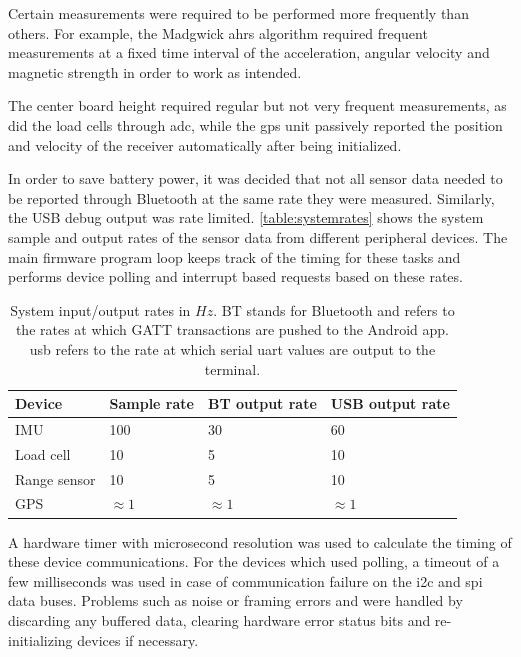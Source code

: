 Certain measurements were required to be performed more frequently than others. For example, the Madgwick \gls{ahrs} algorithm required frequent measurements at a fixed time interval of the acceleration, angular velocity and magnetic strength in order to work as intended.

The center board height required regular but not very frequent measurements, as did the load cells through \gls{adc}, while the \gls{gps} unit passively reported the position and velocity of the receiver automatically after being initialized.

In order to save battery power, it was decided that not all sensor data needed to be reported through Bluetooth at the same rate they were measured. Similarly, the USB debug output was rate limited. \autoref{table:systemrates} shows the system sample and output rates of the sensor data from different peripheral devices. The main firmware program loop keeps track of the timing for these tasks and performs device polling and interrupt based requests based on these rates.

\begin{table}[H]
\centering
\begin{tabular}{ l | l | l | l }
  Device 	& Sample rate & BT output rate 	& USB output rate\\
  \hline
  IMU 		& 100 		& 30 			& 60\\
  Load cell 	& 10 		& 5 			& 10\\
  Range sensor & 10 	& 5 			& 10\\
  GPS 		& $\approx 1$ & $\approx 1$ 	& $\approx 1$\\
\end{tabular}
\caption{System input/output rates in $Hz$. BT stands for Bluetooth and refers to the rates at which GATT transactions are pushed to the Android app. \gls{usb} refers to the rate at which serial \gls{uart} values are output to the terminal.}
\label{table:systemrates}
\end{table}

A hardware timer with microsecond resolution was used to calculate the timing of these device communications. For the devices which used polling, a timeout of a few milliseconds was used in case of communication failure on the \gls{i2c} and \gls{spi} data buses. Problems such as noise or framing errors and were handled by discarding any buffered data, clearing hardware error status bits and re-initializing devices if necessary.
